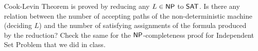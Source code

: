 \documentclass[12pt]{exam}
\begin{document}
\begin{questions}
\begin{solution}
  
  
\end{solution}


\question
Cook-Levin Theorem is proved by reducing any $L \in {\ensuremath{\mathsf{NP}}}$ to ${\mathsf{SAT}}$. Is there any relation between the number of accepting paths of the non-deterministic machine (deciding $L$) and the number of satisfying assignments of the formula produced by the reduction? Check the same for the ${\mathsf{NP}}$-completeness proof for {\sc Independent Set Problem} that we did in class.

\end{questions}

%
\end{document}

